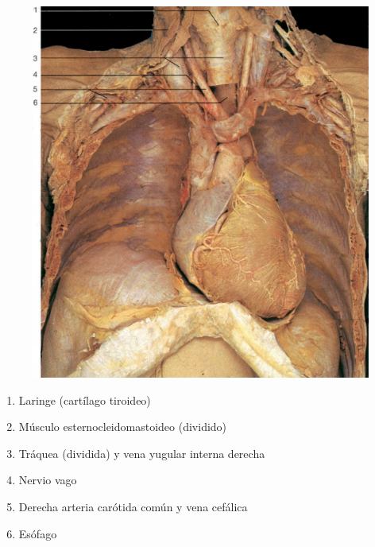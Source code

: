 \begin{figure}[H]
	\begin{center}
 		\includegraphics[width = .7\textwidth]{v2/images/image42.png}
	\end{center} 
\end{figure}
\begin{enumerate}
    \item Laringe (cartílago tiroideo)
    \item Músculo esternocleidomastoideo (dividido)
    \item Tráquea (dividida) y vena yugular interna derecha
    \item Nervio vago
    \item Derecha arteria carótida común y vena cefálica
    \item Esófago    
\end{enumerate}

